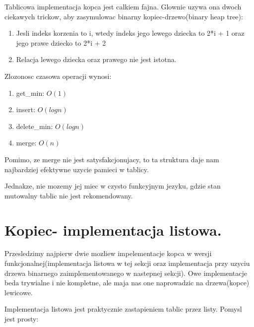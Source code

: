 \documentclass{article}
\begin{document}
Tablicowa implementacja kopca jest calkiem fajna. Glownie uzywa ona dwoch ciekawych trickow, aby zasymulowac binarny kopiec-drzewo(binary heap tree):

\begin{tcolorbox}[colback=white!90!blue,colframe=black!35!blue,title=]

    \begin{enumerate}[label=(\arabic*)]
    \item  Jesli indeks korzenia to i, wtedy indeks jego lewego dziecka to 2*i + 1 oraz jego prawe dziecko to 2*i + 2
    \item Relacja lewego dziecka oraz prawego nie jest istotna.
    \end{enumerate}

\end{tcolorbox}

Zlozonosc czasowa operacji wynosi:

\begin{tcolorbox}[colback=white!90!blue,colframe=black!35!blue,title=]

    \begin{enumerate}[label=(\arabic*)]
        \item get\_min: $O(1)$
        \item insert: $O(logn)$
        \item delete\_min: $O(logn)$
        \item merge: $O(n)$
    \end{enumerate}
\end{tcolorbox}

Pomimo, ze merge nie jest satysfakcjonujacy, to ta struktura daje nam najbardziej efektywne uzycie pamieci w tablicy.

Jednakze, nie mozemy jej miec w czysto funkcyjnym jezyku, gdzie stan mutowalny tablic nie jest rekomendowany.

\section{Kopiec- implementacja listowa.}

Przesledzimy najpierw dwie mozliew impelementacje kopca w wersji funkcjonalnej(implementacja listowa w tej sekcji oraz implementacja przy uzyciu drzewa binarnego zaimplementowanego w nastepnej sekcji). Owe implementacje beda trywialne i nie kompletne, ale maja nas one naprowadzic na drzewa(kopce) lewicowe.

Implementacja listowa jest praktycznie zastapieniem tablic przez listy. Pomysl jest prosty:
\end{document}
